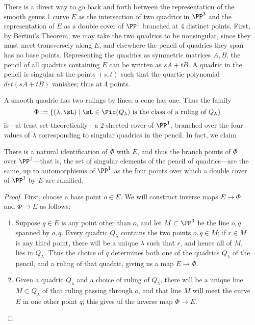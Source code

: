 There is a direct way to go back and forth between the representation of the smooth genus 1 curve $E$ as the intersection of two quadrics in $\PP^3$ and the representation of $E$ as a double cover
of $\PP^1$ branched at 4 distinct points. First, by Bertini's Theorem, we may take the two quadrics to be nonsingular, since they must meet transversely along $E$, and elsewhere the
pencil of quadrics they span has no base points. Representing the quadrics as symmetric matrices $A,B$, the pencil of all quadrics containing $E$ can be 
written as $sA+tB$. A quadric in the pencil is singular at the points $(s,t)$ such that the quartic polynomial $det(sA+tB)$ vanishes; thus at 4 points.

 A smooth quadric has two rulings by lines; a cone has one. Thus the family
$$
\Phi := \{ (\lambda, \sL) \mid \sL \in \Pic(Q_\lambda) \text{ is the class of a ruling of } Q_\lambda \}
$$
is---at least set-theoretically---a 2-sheeted cover of $\PP^1$, branched over the four values of $\lambda$ corresponding to singular quadrics in the pencil. In fact, we claim

\begin{proposition}\label{rulings on pencil}
There is a natural identification of $\Phi$ with $E$, and thus the branch points of $\Phi$ over $\PP^1$---that is, the set of singular elements of the pencil of quadrics---are the same, up to automorphisms of $\PP^1$ as the four points over which a double cover of $\PP^1$ by $E$ are ramified.
\end{proposition} 


\begin{proof}
First, choose a base point $o \in E$. We will construct inverse maps $E \to \Phi$ and $\Phi \to E$ as follows:
\begin{enumerate}

\item Suppose $q \in E$ is any point other than $o$, and let $M\subset \PP^3$ be the line $\overline{o,q}$ spanned by $o,q$. Every quadric $Q_\lambda$ contains the two points $o, q \in M$; if $r \in M$ is any third point, there will be a unique $\lambda$ such that $r$, and hence all of $M$, lies in $Q_\lambda$. Thus the choice of $q$ determines both one of the quadrics $Q_\lambda$ of the pencil, and a ruling of that quadric, giving us a map $E \to \Phi$.

\item  Given a quadric $Q_\lambda$ and a choice of ruling of $Q_\lambda$, there will be a unique line $M \subset Q_\lambda$ of that ruling passing through $o$, and that line $M$ will meet the curve $E$ in one other point $q$; this gives uf the inverse map $\Phi \to E$.
\end{enumerate}
\end{proof}

